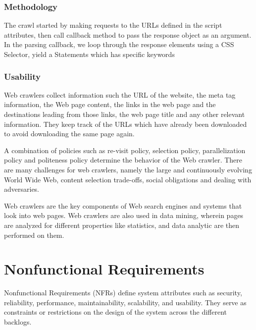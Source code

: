 \documentclass{scrreprt}
\begin{document}
\subsection{Methodology}

The crawl started by making requests to the URLs defined in the script attributes, then call callback method to pass the response object as an argument. In the parsing callback, we loop through the response elements using a CSS Selector, yield a Statements which has specific keywords



\subsection{Usability}
Web crawlers collect information such the URL of the website, the meta tag information, the Web page content, the links in the web page and the destinations leading from those links, the web page title and any other relevant information. They keep track of the URLs which have already been downloaded to avoid downloading the same page again.

A combination of policies such as re-visit policy, selection policy, parallelization policy and politeness policy determine the behavior of the Web crawler. There are many challenges for web crawlers, namely the large and continuously evolving World Wide Web, content selection trade-offs, social obligations and dealing with adversaries.

Web crawlers are the key components of Web search engines and systems that look into web pages. Web crawlers are also used in data mining, wherein pages are analyzed for different properties like statistics, and data analytic are then performed on them.


\chapter{Nonfunctional Requirements}
Nonfunctional Requirements (NFRs) define system attributes such as security, reliability, performance, maintainability, scalability, and usability. They serve as constraints or restrictions on the design of the system across the different backlogs.
\end{document}
